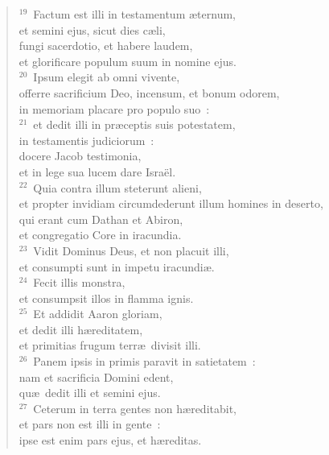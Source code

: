 \begin{flushleft}
\begin{verse}
${}^{19}$~Factum est illi in testamentum \ae ternum,\\ et semini ejus, sicut dies c\ae li,\\ fungi sacerdotio, et habere laudem,\\ et glorificare populum suum in nomine ejus.\\
${}^{20}$~Ipsum elegit ab omni vivente,\\ offerre sacrificium Deo, incensum, et bonum odorem,\\ in memoriam placare pro populo suo~:\\
${}^{21}$~et dedit illi in pr\ae ceptis suis potestatem,\\ in testamentis judiciorum~:\\ docere Jacob testimonia,\\ et in lege sua lucem dare Isra\"el.\\
${}^{22}$~Quia contra illum steterunt alieni,\\ et propter invidiam circumdederunt illum homines in deserto,\\ qui erant cum Dathan et Abiron,\\ et congregatio Core in iracundia.\\
${}^{23}$~Vidit Dominus Deus, et non placuit illi,\\ et consumpti sunt in impetu iracundi\ae .\\
${}^{24}$~Fecit illis monstra,\\ et consumpsit illos in flamma ignis.\\
${}^{25}$~Et addidit Aaron gloriam,\\ et dedit illi h\ae reditatem,\\ et primitias frugum terr\ae\ divisit illi.\\
${}^{26}$~Panem ipsis in primis paravit in satietatem~:\\ nam et sacrificia Domini edent,\\ qu\ae\ dedit illi et semini ejus.\\
${}^{27}$~Ceterum in terra gentes non h\ae reditabit,\\ et pars non est illi in gente~:\\ ipse est enim pars ejus, et h\ae reditas.\end{verse}\end{flushleft}


